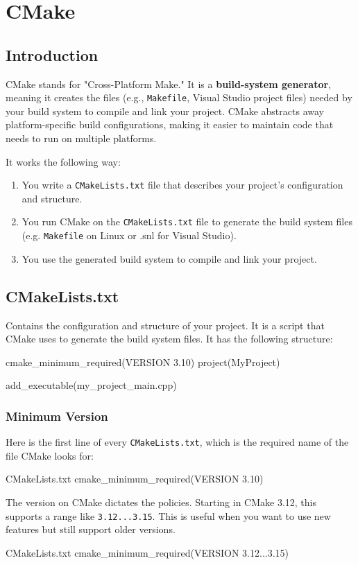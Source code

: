 \chapter{CMake}

\section{Introduction}

CMake stands for "Cross-Platform Make." It is a \textbf{build-system generator}, meaning it creates the files (e.g., \texttt{Makefile}, Visual Studio project files) needed by your build system to compile and link your project.
CMake abstracts away platform-specific build configurations, making it easier to maintain code that needs to run on multiple platforms.

It works the following way:
\begin{enumerate}
    \item You write a \texttt{CMakeLists.txt} file that describes your project's configuration and structure.
    \item You run CMake on the \texttt{CMakeLists.txt} file to generate the build system files (e.g. \texttt{Makefile} on Linux or .snl for Visual Studio).
    \item You use the generated build system to compile and link your project.
\end{enumerate}

\section{CMakeLists.txt}

Contains the configuration and structure of your project. It is a script that CMake uses to generate the build system files.
It has the following structure:

\begin{neonlisting}[language=C++]{}
cmake_minimum_required(VERSION 3.10) 
project(MyProject)  

add_executable(my_project_main.cpp) 
\end{neonlisting}

\subsection{Minimum Version}

Here is the first line of every \texttt{CMakeLists.txt}, which is the required name of the file CMake looks for:
\begin{neonlisting}{CMakeLists.txt}
    cmake_minimum_required(VERSION 3.10)
\end{neonlisting}
The version on CMake dictates the policies. Starting in CMake 3.12, this supports
a range like \texttt{3.12...3.15}. This is useful when you want to use new features but still support older versions.
\begin{neonlisting}{CMakeLists.txt}
    cmake_minimum_required(VERSION 3.12...3.15)
\end{neonlisting}

